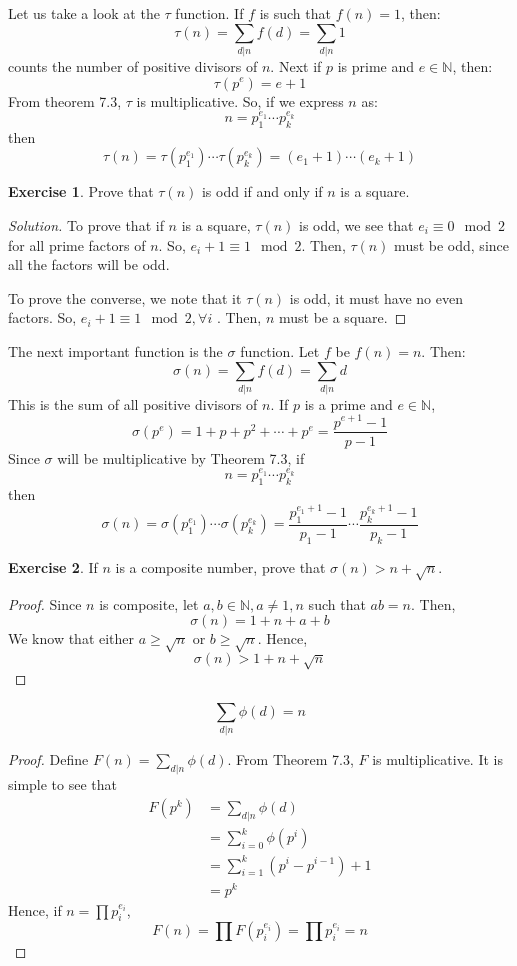 \documentclass[12pt,letterpaper]{book}
\theoremstyle{definition}
\newtheorem*{exercise}{Exercise}
\newenvironment{solution}
  {\renewcommand\qedsymbol{$\blacksquare$}\begin{proof}[Solution]}
  {\end{proof}}
\newcommand{\N}{\mathbb{N}}
\begin{document}
Let us take a look at the $\tau$ function. If $f$ is such that $f(n) = 1$, then:
\[\tau(n) = \sum_{d|n} f(d) = \sum_{d|n} 1\]
counts the number of positive divisors of $n$. Next if $p$ is prime and $e \in \N$, then:
\[\tau(p^e) = e+1\]
From theorem 7.3, $\tau$ is multiplicative. So, if we express $n$ as:
\[n = p_1^{e_1} \cdots p_k^{e_k}\]
then
\[\tau(n) = \tau(p_1^{e_1}) \cdots \tau(p_k^{e_k}) = (e_1+1) \cdots (e_k+1)\]

\begin{exercise}
  Prove that $\tau(n)$ is odd if and only if $n$ is a square.
\end{exercise}
\begin{solution}
  To prove that if $n$ is a square, $\tau(n)$ is odd, we see that $e_i \equiv 0 \mod 2$  for all prime factors of $n$. So, $e_i+1 \equiv 1 \mod 2$. Then, $\tau(n)$ must be odd, since all the factors will be odd.

  To prove the converse, we note that it $\tau(n)$ is odd, it must have no even factors. So, $e_i+1 \equiv 1 \mod 2, \forall i$ . Then, $n$ must be a square.
\end{solution}

The next important function is the $\sigma$ function. Let $f$ be $f(n) = n$. Then:
\[\sigma(n) = \sum_{d|n}f(d) = \sum_{d|n}d\]
This is the sum of all positive divisors of $n$. If $p$ is a prime and $e \in \N$,
\[\sigma(p^e) = 1 + p + p^2 + \cdots + p^e = \frac{p^{e+1} - 1}{p-1}\]
Since $\sigma$ will be multiplicative by Theorem 7.3, if
\[n = p_1^{e_1} \cdots p_k^{e_k}\]
then
\[\sigma(n) = \sigma(p_1^{e_1}) \cdots \sigma(p_k^{e_k}) = \frac{p_1^{e_1+1}-1}{p_1-1} \cdots \frac{p_k^{e_k+1} - 1}{p_k-1}\]

\begin{exercise}
  If $n$ is a composite number, prove that $\sigma(n) > n + \sqrt n$.
\end{exercise}
\begin{proof}
  Since $n$ is composite, let $a,b \in \N, a \neq 1,n$ such that $ab = n$. Then,
  \[\sigma(n) = 1 + n + a + b\]
  We know that either $a \geq \sqrt n$ or $b \geq \sqrt n$. Hence,
  \[\sigma(n) > 1 + n + \sqrt n\]
\end{proof}

\begin{lemma}
  \[\sum_{d|n} \phi(d) = n\] 
\end{lemma}
\begin{proof}
  Define $F(n) = \sum_{d|n} \phi(d)$. From Theorem 7.3,  $F$ is multiplicative. It is simple to see that
  \begin{align*}
    F(p^k) &= \sum_{d|n} \phi(d)\\
           &= \sum_{i = 0}^k \phi(p^i)\\
           &= \sum_{i = 1}^k (p^i - p^{i-1}) + 1 \\
           &= p^k
  \end{align*}
  Hence, if $n = \prod p_i^{e_i}$,
  \[F(n) = \prod F(p_i^{e_i}) = \prod p_i^{e_i} = n\]
\end{proof}
\end{document}
